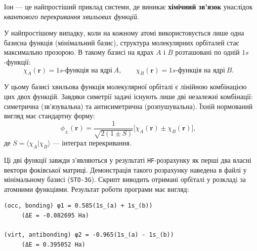 Іон  --- це найпростіший приклад системи, де виникає
\textbf{хімічний зв’язок} унаслідок \emph{квантового перекривання хвильових функцій}.


У найпростішому випадку, коли на кожному атомі використовується лише одна базисна функція (мінімальний базис), структура молекулярних орбіталей стає максимально прозорою. В такому базисі на ядрах $A$ і $B$ розташовані по одній $1s$-функції:
\[
	\chi_A(\mathbf r) = 1s\text{-функція на ядрі}\ A,
	\qquad
	\chi_B(\mathbf r) = 1s\text{-функція на ядрі}\ B.
\]

У цьому базисі хвильова функція молекулярної орбіталі є лінійною комбінацією цих двох функцій. Завдяки симетрії задачі існують лише дві незалежні комбінації: симетрична (зв’язувальна) та антисиметрична (розпушувальна). Їхній нормований вигляд має стандартну форму:
\[
	\phi_\pm(\mathbf{r}) =
	\frac{1}{\sqrt{2(1 \pm S)}}
	\bigl[\chi_A(\mathbf{r}) \pm \chi_B(\mathbf{r})\bigr],
\]
де $S = \langle \chi_A | \chi_B \rangle$ --- інтеграл перекривання.

%


Ці дві функції завжди з’являються у результаті \texttt{HF}-розрахунку як перші два власні вектори фоківської матриці.
Демонстрація такого розрахунку наведена в файлі  у мінімальному базисі (\texttt{STO-3G}). Скрипт виводить отримані орбіталі у розкладi за атомними функціями. Результат роботи програми має вигляд:

\begin{verbatim}
(occ, bonding) φ1 = 0.585(1s_(a) + 1s_(b))
     (ΔE = -0.082695 Ha)

(virt, antibonding) φ2 = -0.965(1s_(a) - 1s_(b))
     (ΔE = 0.395052 Ha)
\end{verbatim}

